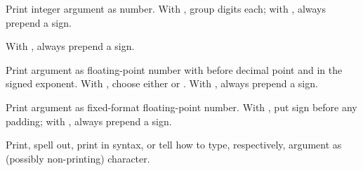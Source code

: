 \begin{LIST}{1cm}
\begin{LIST}{.5cm}
    {%
      Print integer argument as number. With \kwd{:}, group digits 
       each; with , always prepend a sign.
    }

    {%
       With
      , always pre\-pend a sign. 
    }

    {%
      Print argument as floating-point number with 
      before decimal point and  in the signed
      exponent. With , choose either  or
      . With , always prepend a sign. 
    }

    {%
      Print argument as fixed-format floating-point number. With \KWD{:},
      put sign before any padding; with , always prepend a sign.}
    
    {%
      Print, spell out, print in \kwd{\#$\backslash$} syntax, or tell
      how to type, respectively, argument as (possibly non-printing)
      character. 
    }


\end{LIST}
\end{LIST}
